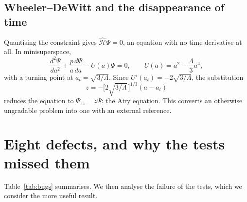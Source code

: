 \documentclass[11pt,a4paper]{article}
\theoremstyle{plain}
\theoremstyle{definition}
\begin{document}
\subsection{Wheeler--DeWitt and the disappearance of time}

Quantising the constraint gives $\hat{\mathcal H}\Psi=0$, an equation with no
time derivative at all. In minisuperspace,
\begin{equation}
\frac{d^2\Psi}{da^2}+\frac{p}{a}\frac{d\Psi}{da}-U(a)\Psi=0,
\qquad U(a)=a^2-\frac{\Lambda}{3}a^4,
\end{equation}
with a turning point at $a_t=\sqrt{3/\Lambda}$. Since
$U'(a_t)=-2\sqrt{3/\Lambda}$, the substitution
\begin{equation}
z=-\big[2\sqrt{3/\Lambda}\,\big]^{1/3}(a-a_t)
\end{equation}
reduces the equation to $\Psi_{zz}=z\Psi$: the Airy equation. This converts an
otherwise ungradable problem into one with an external reference.

\section{Eight defects, and why the tests missed them}\label{sec:bugs}

Table~\ref{tab:bugs} summarises. We then analyse the failure of the tests,
which we consider the more useful result.
\end{document}
